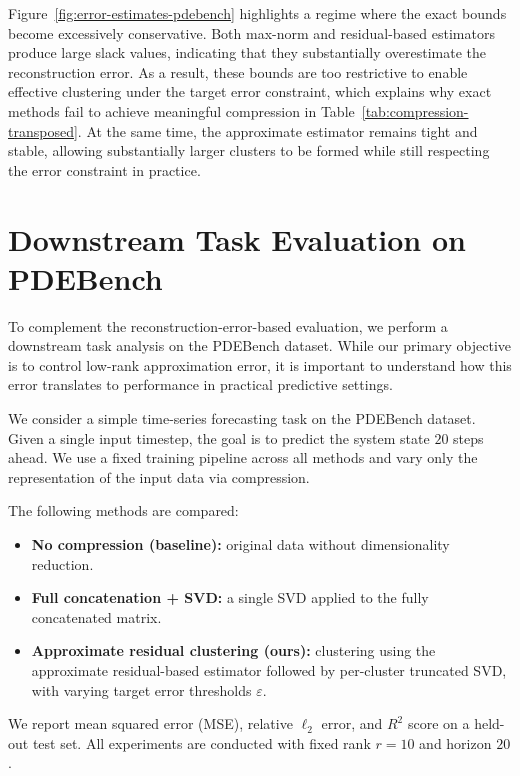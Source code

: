 \documentclass[10pt]{article} %
\begin{document}
Figure~\ref{fig:error-estimates-pdebench} highlights a regime where the exact bounds become excessively conservative.
Both max-norm and residual-based estimators produce large slack values, indicating that they substantially overestimate the reconstruction error.
As a result, these bounds are too restrictive to enable effective clustering under the target error constraint, which explains why exact methods fail to achieve meaningful compression in Table~\ref{tab:compression-transposed}.
At the same time, the approximate estimator remains tight and stable, allowing substantially larger clusters to be formed while still respecting the error constraint in practice.


\section{Downstream Task Evaluation on PDEBench}
\label{app:downstream-pdebench}

To complement the reconstruction-error-based evaluation, we perform a downstream task analysis on the PDEBench dataset.
While our primary objective is to control low-rank approximation error, it is important to understand how this error translates to performance in practical predictive settings.

We consider a simple time-series forecasting task on the PDEBench dataset.
Given a single input timestep, the goal is to predict the system state $20$ steps ahead.
We use a fixed training pipeline across all methods and vary only the representation of the input data via compression.

The following methods are compared:
\begin{itemize}
    \item \textbf{No compression (baseline):} original data without dimensionality reduction.
    \item \textbf{Full concatenation + SVD:} a single SVD applied to the fully concatenated matrix.
    \item \textbf{Approximate residual clustering (ours):} clustering using the approximate residual-based estimator followed by per-cluster truncated SVD, with varying target error thresholds $\varepsilon$.
\end{itemize}

We report mean squared error (MSE), relative $\ell_2$ error, and $R^2$ score on a held-out test set.
All experiments are conducted with fixed rank $r=10$ and horizon $20$.
\end{document}
